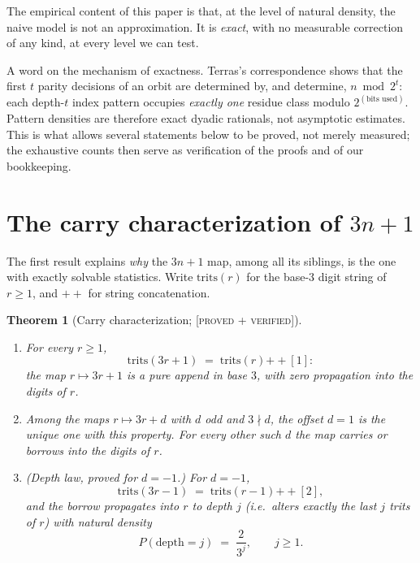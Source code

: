 \documentclass[11pt]{article}
\newtheorem{theorem}{Theorem}[section]
\theoremstyle{definition}
\newcommand{\PROVEDVER}{\textup{[\textsc{proved + verified}]}}
\begin{document}
The empirical content of this paper is that, at the level of natural density, the naive
model is not an approximation. It is \emph{exact}, with no measurable correction of any
kind, at every level we can test.

A word on the mechanism of exactness. Terras's correspondence \cite{Terras1976} shows
that the first $t$ parity decisions of an orbit are determined by, and determine,
$n \bmod 2^t$: each depth-$t$ index pattern occupies \emph{exactly one} residue class
modulo $2^{(\text{bits used})}$. Pattern densities are therefore exact dyadic rationals,
not asymptotic estimates. This is what allows several statements below to be proved,
not merely measured; the exhaustive counts then serve as verification of the proofs and
of our bookkeeping.

\section{The carry characterization of $3n+1$}

The first result explains \emph{why} the $3n+1$ map, among all its siblings, is the one
with exactly solvable statistics. Write $\mathrm{trits}(r)$ for the base-$3$ digit
string of $r \geq 1$, and $\mathbin{+\!\!+}$ for string concatenation.

\begin{theorem}[Carry characterization; \PROVEDVER]\label{thm:carry}
\leavevmode
\begin{enumerate}[label=(\alph*)]
\item For every $r \geq 1$,
\[
\mathrm{trits}(3r+1) \;=\; \mathrm{trits}(r) \mathbin{+\!\!+} [1]:
\]
the map $r \mapsto 3r+1$ is a pure append in base $3$, with zero propagation into the
digits of $r$.
\item Among the maps $r \mapsto 3r + d$ with $d$ odd and $3 \nmid d$, the offset
$d = 1$ is the unique one with this property. For every other such $d$ the map carries
or borrows into the digits of $r$.
\item \textup{(Depth law, proved for $d = -1$.)} For $d = -1$,
\[
\mathrm{trits}(3r-1) \;=\; \mathrm{trits}(r-1) \mathbin{+\!\!+} [2],
\]
and the borrow propagates into $r$ to depth $j$ (i.e.\ alters exactly the last $j$
trits of $r$) with natural density
\[
P(\mathrm{depth} = j) \;=\; \frac{2}{3^j}, \qquad j \geq 1.
\]
\end{enumerate}
\end{theorem}
\end{document}
